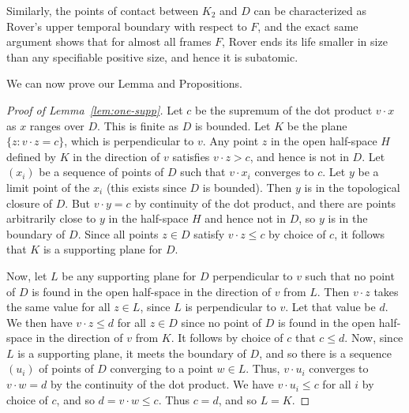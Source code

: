 Similarly, the points of contact between $K_2$ and $D$ can be characterized as Rover's upper temporal boundary with respect to $F$, and the exact same argument shows that for almost all frames $F$, Rover ends its life smaller in size than any specifiable positive size, and hence it is subatomic.

We can now prove our Lemma and Propositions.

\begin{proof}[Proof of Lemma~\ref{lem:one-supp}]
Let $c$ be the supremum of the dot product $v\cdot x$ as $x$ ranges over $D$. This is finite as $D$ is bounded. Let 
$K$ be the plane $\{ z : v\cdot z = c \}$, which is perpendicular to $v$. Any point $z$ in the open half-space $H$ defined by $K$ in the direction of $v$ satisfies $v\cdot z > c$, and hence is not in $D$. Let $(x_i)$ be a sequence of points of $D$ such that $v\cdot x_i$ converges to $c$. Let $y$ be a limit point of the $x_i$ (this exists since $D$ is bounded). Then $y$ is in the topological closure of $D$. But $v\cdot y = c$ by continuity of the dot product, and there are points arbitrarily close to $y$ in the half-space $H$ and hence not in $D$, so $y$ is in the boundary of $D$. Since all points $z\in D$ satisfy $v\cdot z \le c$ by choice of $c$, it follows that $K$ is a supporting plane for $D$.
 
Now, let $L$ be any supporting plane for $D$ perpendicular to $v$ such that no point of $D$ is found in the open half-space in the direction of $v$ from $L$. Then $v\cdot z$ takes the same value for all $z \in L$, since $L$ is perpendicular to $v$. Let that value be $d$. We then have $v\cdot z \le d$ for all $z\in D$ since no point of $D$ is found in the open half-space in the direction of $v$ from $K$. It follows by choice of $c$ that $c \le d$. Now, since $L$ is a supporting plane, it meets the boundary of $D$, and so there is a sequence $(u_i)$ of points of $D$ converging to a point $w\in L$. Thus, $v\cdot u_i$ converges to $v\cdot w = d$ by  the continuity of the dot product. We have $v\cdot u_i \le c$ for all $i$ by choice of $c$, and so $d = v\cdot w \le c$.
Thus $c = d$, and so $L = K$.
\end{proof}


